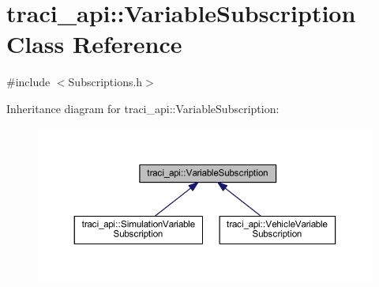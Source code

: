 \hypertarget{classtraci__api_1_1_variable_subscription}{}\section{traci\+\_\+api\+:\+:Variable\+Subscription Class Reference}
\label{classtraci__api_1_1_variable_subscription}


{\ttfamily \#include $<$Subscriptions.\+h$>$}



Inheritance diagram for traci\+\_\+api\+:\+:Variable\+Subscription\+:
\nopagebreak
\begin{figure}[H]
\begin{center}
\leavevmode
\includegraphics[width=350pt]{classtraci__api_1_1_variable_subscription__inherit__graph}
\end{center}
\end{figure}
